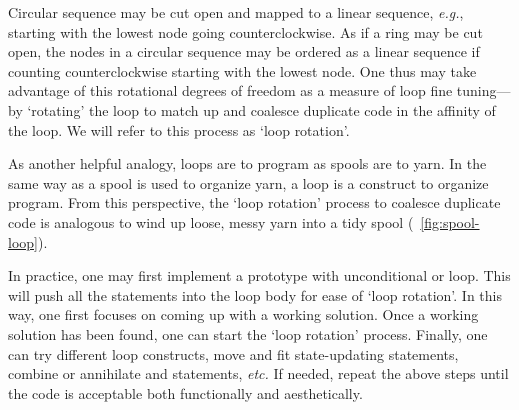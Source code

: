 Circular sequence may be cut open and mapped to a linear sequence, \textit{e.g.}, starting with
the lowest node going counterclockwise.
As if a ring may be cut open, the nodes in a circular sequence may be ordered as a linear sequence
if counting counterclockwise starting with the lowest node.
One thus may take advantage of this rotational degrees of freedom as a measure of loop fine
tuning---by `rotating' the loop to match up and coalesce duplicate code in the affinity of the loop.
We will refer to this process as `loop rotation'.


As another helpful analogy, loops are to program as spools are to yarn.
In the same way as a spool is used to organize yarn, a loop is a construct to organize program.
From this perspective, the `loop rotation' process to coalesce duplicate code is analogous to
wind up loose, messy yarn into a tidy spool (~\autoref{fig:spool-loop}).


In practice, one may first implement a prototype with unconditional  or
 loop.
This will push all the statements into the loop body for ease of `loop rotation'.
In this way, one first focuses on coming up with a working solution.
Once a working solution has been found, one can start the `loop rotation' process.
Finally, one can try different loop constructs, move and fit state-updating statements,
combine or annihilate  and  statements, \textit{etc.}
If needed, repeat the above steps until the code is acceptable both functionally and
aesthetically.


